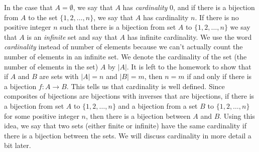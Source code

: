 In the case that $A = \emptyset$, we say that $A$ has \emph{cardinality} $0$, and if there is a bijection from $A$ to the set $\{1,2, \ldots, n\}$, we say that $A$ has cardinality $n$.  If there is no positive integer $n$ such that there is a bijection from set $A$ to $\{1,2, \ldots, n\}$ we say that $A$ is an \emph{infinite} set and say that $A$ has infinite cardinality. We use the word \emph{cardinality} instead of number of elements because we can't actually count the number of elements in an infinite set. We denote the cardinality of the set (the number of elements in the set) $A$ by $|A|$. It is left to the homework to show that if $A$ and $B$ are sets with $|A|=n$ and $|B| = m$, then $n=m$ if and only if there is a bijection $f: A \to B$. This tells us that cardinality is well defined. Since composites of bijections are bijections with inverses that are bijections, if there is a bijection from set $A$ to $\{1,2, \ldots, n\}$ and a bijection from a set $B$ to $\{1,2, \ldots, n\}$ for some positive integer $n$, then there is a bijection between $A$ and $B$. Using this idea, we say that two sets (either finite or infinite) have the same cardinality if there is a bijection between the sets. We will discuss cardinality in more detail a bit later. 


